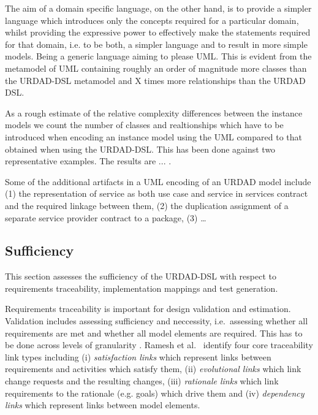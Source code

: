 The aim of a domain specific language, on the other hand, is to provide a simpler language which introduces only the concepts required for a particular domain, whilst providing the expressive power to effectively make the statements required for that domain, i.e. to be both, a simpler language and to result in more simple models. Being a generic language aiming to please UML. This is evident from the metamodel of UML containing roughly an order of magnitude more classes than the URDAD-DSL metamodel and  X times more relationships than the URDAD DSL.

As a rough estimate of the relative complexity differences between the instance models we count the number of classes and realtionships which have to be introduced when encoding an instance model using the UML compared to that obtained when using the URDAD-DSL. This has been done against two representative examples. The results are ... . 


 Some of the additional artifacts in a UML encoding of an URDAD model include (1) the representation of service as both use case and service in services contract and the required linkage between them, (2) the duplication assignment of a separate service provider contract to a package, (3) \dots



\subsection{Sufficiency}

This section assesses the sufficiency of the URDAD-DSL with respect to requirements traceability, implementation mappings and test generation. 

Requirements traceability is important for design validation and estimation. Validation includes assessing sufficiency and neccessity, i.e.\ assessing whether all requirements are met and whether all model elements are required. This has to be done across levels of granularity \cite{dick_design_2005}. Ramesh et al.\ \cite{ramesh_toward_2001} identify four core traceability link types including (i) \emph{satisfaction links} which represent links between requirements and activities which satisfy them, (ii) \emph{evolutional links} which link change requests and the resulting changes, (iii) \emph{rationale links} which link requirements to the rationale (e.g. goals) which drive them and (iv) \emph{dependency links} which represent links between model elements.

